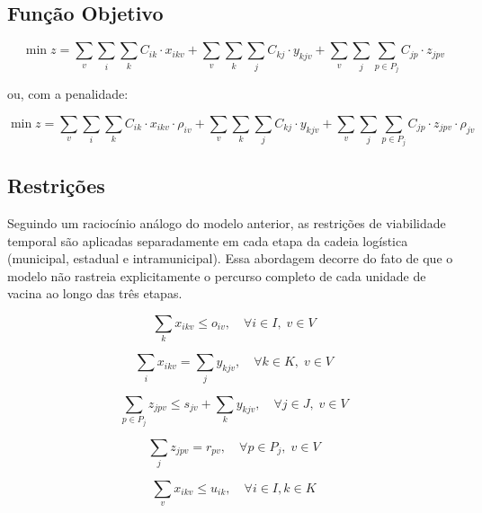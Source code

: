 \subsection{Função Objetivo}

\begin{equation}
\min z =
\sum_{v} \sum_{i} \sum_{k} C_{ik} \cdot x_{ikv}
+
\sum_{v} \sum_{k} \sum_{j} C_{kj} \cdot y_{kjv}
+
\sum_{v} \sum_{j} \sum_{p \in P_j} C_{jp} \cdot z_{jpv}
\label{unificado_estendido}
\end{equation}

ou, com a penalidade:

\begin{equation}
\min z =
\sum_{v} \sum_{i} \sum_{k} C_{ik} \cdot x_{ikv} \cdot \rho_{iv}
+
\sum_{v} \sum_{k} \sum_{j} C_{kj} \cdot y_{kjv}
+
\sum_{v} \sum_{j} \sum_{p \in P_j} C_{jp} \cdot z_{jpv} \cdot \rho_{jv}
\label{unificado_estendido}
\end{equation}

\subsection{Restrições}

Seguindo um raciocínio análogo do modelo anterior, as restrições de viabilidade temporal são aplicadas separadamente em cada etapa da cadeia logística (municipal, estadual e intramunicipal). Essa abordagem decorre do fato de que o modelo não rastreia explicitamente o percurso completo de cada unidade de vacina ao longo das três etapas.

\begin{equation*}
\sum_{k} x_{ikv} \le o_{iv}, \quad \forall i \in I, \; v \in V
\end{equation*}

\begin{equation*}
\sum_{i} x_{ikv} = \sum_{j} y_{kjv}, \quad \forall k \in K, \; v \in V
\end{equation*}

\begin{equation*}
\sum_{p \in P_j} z_{jpv} \le 
s_{jv} +\sum_{k} y_{kjv}, \quad \forall j \in J, \; v \in V
\end{equation*}

\begin{equation*}
\sum_{j} z_{jpv} = r_{pv}, \quad \forall p \in P_j, \; v \in V
\end{equation*}

\begin{equation*}
\sum_{v} x_{ikv} \le u_{ik}, \quad \forall i \in I, k \in K
\end{equation*}

